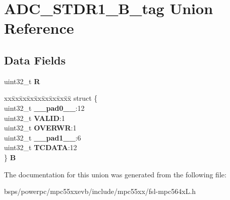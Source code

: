 \hypertarget{unionADC__STDR1__32B__tag}{}\section{A\+D\+C\+\_\+\+S\+T\+D\+R1\+\_\+B\+\_\+tag Union Reference}
\label{unionADC__STDR1__32B__tag}
\subsection*{Data Fields}
\begin{DoxyCompactItemize}
\item 
\mbox{\label{unionADC__STDR1__32B__tag_ac1727e11eec36c8f8e44685a438899b4}} 
uint32\+\_\+t {\bfseries R}
\item 
\mbox{\label{unionADC__STDR1__32B__tag_ac590110078c3b27520631c45f69b6812}} 
\begin{tabbing}
xx\=xx\=xx\=xx\=xx\=xx\=xx\=xx\=xx\=\kill
struct \{\\
\>uint32\_t {\bfseries \_\_pad0\_\_}:12\\
\>uint32\_t {\bfseries VALID}:1\\
\>uint32\_t {\bfseries OVERWR}:1\\
\>uint32\_t {\bfseries \_\_pad1\_\_}:6\\
\>uint32\_t {\bfseries TCDATA}:12\\
\} {\bfseries B}\\

\end{tabbing}\end{DoxyCompactItemize}


The documentation for this union was generated from the following file\+:\begin{DoxyCompactItemize}
\item 
bsps/powerpc/mpc55xxevb/include/mpc55xx/fsl-\/mpc564x\+L.\+h\end{DoxyCompactItemize}
